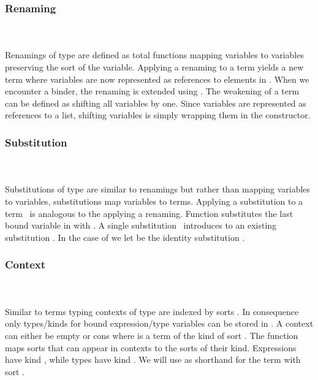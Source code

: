 \subsubsection{Renaming}\hfill\\\\
Renamings  of type    are defined as total functions mapping variables    to variables    preserving the sort  of the variable.
\FRen
Applying a renaming    to a term    yields a new term    where variables are now represented as references    to elements in .
\Fren
When we encounter a binder, the renaming is extended using \Frenext. 
The weakening of a term can be defined as shifting all variables by one.
\Fwk 
Since variables are represented as references to a list, shifting variables is simply wrapping them in the  constructor.

\subsubsection{Substitution}\hfill\\\\
Substitutions  of type    are similar to renamings but rather than mapping variables to variables, substitutions map variables to terms.
\FSub
Applying a substitution to a term \Fsub\ is analogous to the applying a renaming. 
Function  \Data{[}  \Data{]} substitutes the last bound variable in  with .
\Fsubs
A single substitution \Fsinglesub\ introduces  to an existing substitution . In the case of \Data{\_[\_]} we let  be the identity substitution \Fidsub.

\subsubsection{Context}\hfill\\\\
Similar to terms typing contexts  of type   are indexed by sorts . In consequence only types/kinds for bound expression/type variables can be stored in .
\FCtx
A context can either be empty  or cons    where  is a term of the kind of sort . The function  maps sorts that can appear in contexts to the sorts of their kind.
\Fkind
Expressions have kind , while types have kind . We will use  as shorthand for the term with sort  .

